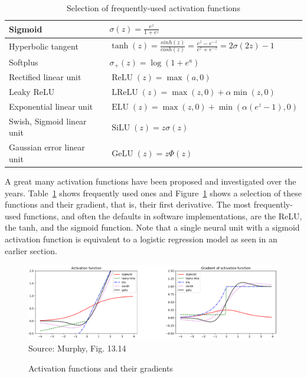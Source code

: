 \begin{table}
\renewcommand{\arraystretch}{1.5}

\begin{tabular}{l|l} \hline
Sigmoid & $\sigma(z) = \frac{e^z}{1+e^z}$  \\ \hline
Hyperbolic tangent & $\tanh(z)=\frac{sinh(z)}{cosh(z)} = \frac{e^z-e^{-z}}{e^z+e^{-z}} = 2\sigma(2z)-1$  \\ \hline
Softplus & $\sigma_+(z) = \log(1+e^a)$ \\ \hline
Rectified linear unit & $\operatorname{ReLU}(z) = \max(a, 0) $ \\ \hline
Leaky ReLU & $\operatorname{LReLU}(z)=\max(z, 0) + \alpha \min(z, 0)$  \\ \hline
Exponential linear unit & $\operatorname{ELU}(z) = \max(z, 0) + \min(\alpha(e^z-1), 0)$ \\ \hline
Swish, Sigmoid linear unit & $\operatorname{SiLU}(z) = z \sigma(z)$ \\ \hline
Gaussian error linear unit & $\operatorname{GeLU}(z) = z \Phi(z)$ \\ \hline
\end{tabular}
\caption{Selection of frequently-used activation functions}
\label{tab:activation}
\end{table}

A great many activation functions have been proposed and investigated over the years. Table~\ref{tab:activation} shows frequently used ones and Figure~\ref{fig:activation} shows a selection of these functions and their gradient, that is, their first derivative. The most frequently-used functions, and often the defaults in software implementations, are the ReLU, the tanh, and the sigmoid function. Note that a single neural unit with a sigmoid activation function is equivalent to a logistic regression model as seen in an earlier section.

\begin{figure}
\centering
\includegraphics[width=.9\textwidth]{screen6} \\

\scriptsize Source: Murphy, Fig. 13.14
\caption{Activation functions and their gradients}
\label{fig:activation}
\end{figure}

